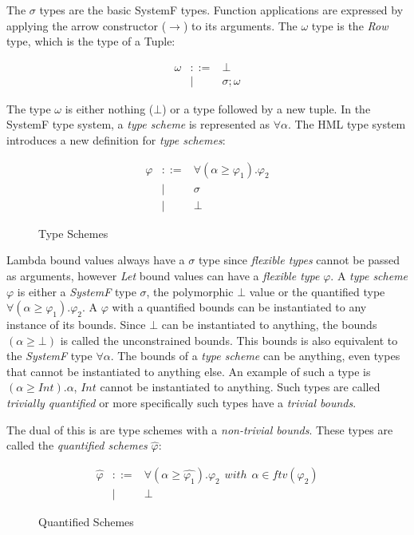 \documentclass[twoside, titlepage, openright, a4paper]{book}
\renewcommand{\geq}{\geqslant}
\begin{document}
The $\sigma$ types are the basic SystemF types. Function applications are expressed by applying the arrow constructor ($\rightarrow$) to its arguments. The $\omega$ type is the \emph{Row} type, which is the type of a Tuple:

\begin{eqnarray*}
\omega & ::= & \bot \\
       & | & \sigma ; \omega
\end{eqnarray*}

The type $\omega$ is either nothing ($\bot$) or a type followed by a new tuple.
In the SystemF type system, a \emph{type scheme} is represented as $\forall \alpha$. The HML type system introduces a new definition for \emph{type schemes}:

\begin{figure}[H]
\begin{eqnarray*}
\varphi & ::= & \forall (\alpha \geq \varphi_1). \varphi_2 \\
        & | & \sigma \\
        & | & \bot
\end{eqnarray*}
\caption{Type Schemes}
\label{type-schemes}
\end{figure}

Lambda bound values always have a $\sigma$ type since \emph{flexible types} cannot be passed as arguments, however \emph{Let} bound values can have a \emph{flexible type} $\varphi$.
A \emph{type scheme} $\varphi$ is either a \emph{SystemF} type $\sigma$, the polymorphic $\bot$ value or the quantified type $\forall (\alpha \geq \varphi_1). \varphi_2$. A $\varphi$ with a quantified bounds can be instantiated to any instance of its bounds. Since $\bot$ can be instantiated to anything, the bounds $(\alpha \geq \bot)$ is called the unconstrained bounds. This bounds is also equivalent to the \emph{SystemF} type $\forall \alpha$. The bounds of a \emph{type scheme} can be anything, even types that cannot be instantiated to anything else. An example of such a type is $(\alpha \geq Int).\alpha$, $Int$ cannot be instantiated to anything. Such types are called \emph{trivially quantified} or more specifically such types have a \emph{trivial bounds}.

The dual of this is are type schemes with a \emph{non-trivial bounds}. These types are called the \emph{quantified schemes} $\hat{\varphi}$:

\begin{figure}[H]
\begin{eqnarray*}
\hat{\varphi} & ::= & \forall (\alpha \geq \hat{\varphi_1}). \varphi_2 \hspace{5pt} with \hspace{5pt} \alpha \in ftv(\varphi_2) \\
              & | & \bot
\end{eqnarray*}
\caption{Quantified Schemes}
\label{quantified-schemes}
\end{figure}
\end{document}

